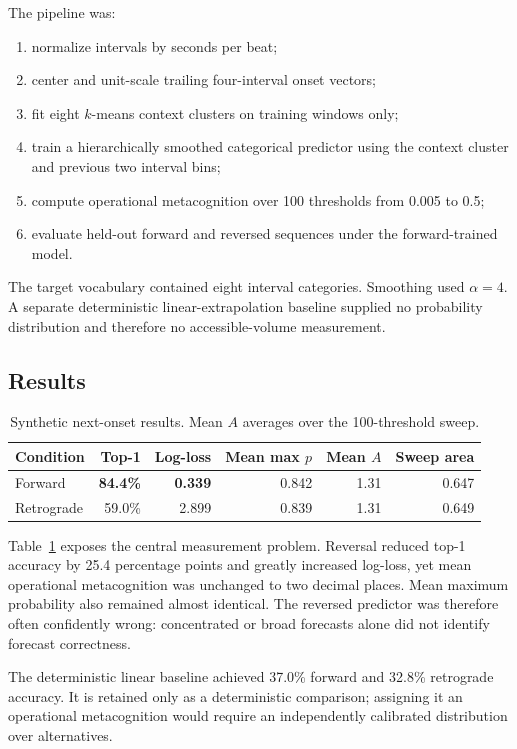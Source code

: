 \documentclass[11pt,a4paper]{article}
\begin{document}
The pipeline was:
\begin{enumerate}[nosep]
  \item normalize intervals by seconds per beat;
  \item center and unit-scale trailing four-interval onset vectors;
  \item fit eight $k$-means context clusters on training windows only;
  \item train a hierarchically smoothed categorical predictor using the context cluster and previous two interval bins;
  \item compute operational metacognition over 100 thresholds from 0.005 to 0.5;
  \item evaluate held-out forward and reversed sequences under the forward-trained model.
\end{enumerate}
The target vocabulary contained eight interval categories. Smoothing used $\alpha=4$. A separate deterministic linear-extrapolation baseline supplied no probability distribution and therefore no accessible-volume measurement.

\subsection{Results}
\begin{table}[htbp]
\centering
\caption{Synthetic next-onset results. Mean $A$ averages over the 100-threshold sweep.}
\label{tab:synthetic}
\begin{tabular}{lrrrrr}
\toprule
Condition & Top-1 & Log-loss & Mean max $p$ & Mean $A$ & Sweep area \\
\midrule
Forward & \textbf{84.4\%} & \textbf{0.339} & 0.842 & 1.31 & 0.647 \\
Retrograde & 59.0\% & 2.899 & 0.839 & 1.31 & 0.649 \\
\bottomrule
\end{tabular}
\end{table}

Table~\ref{tab:synthetic} exposes the central measurement problem. Reversal reduced top-1 accuracy by 25.4 percentage points and greatly increased log-loss, yet mean operational metacognition was unchanged to two decimal places. Mean maximum probability also remained almost identical. The reversed predictor was therefore often confidently wrong: concentrated or broad forecasts alone did not identify forecast correctness.

The deterministic linear baseline achieved 37.0\% forward and 32.8\% retrograde accuracy. It is retained only as a deterministic comparison; assigning it an operational metacognition would require an independently calibrated distribution over alternatives.
\end{document}
